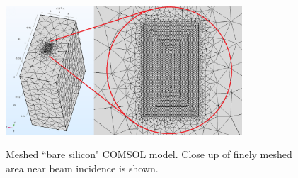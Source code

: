 \documentclass[preprint]{iucr}              %
\begin{document}







\begin{figure}
\caption{Meshed ``bare silicon" COMSOL model. Close up of finely meshed area near beam incidence is shown.}
\includegraphics[width = 8.85cm]{images/bare_silicon.png}
\label{fig:bare_silicon}
\end{figure}
\end{document}
